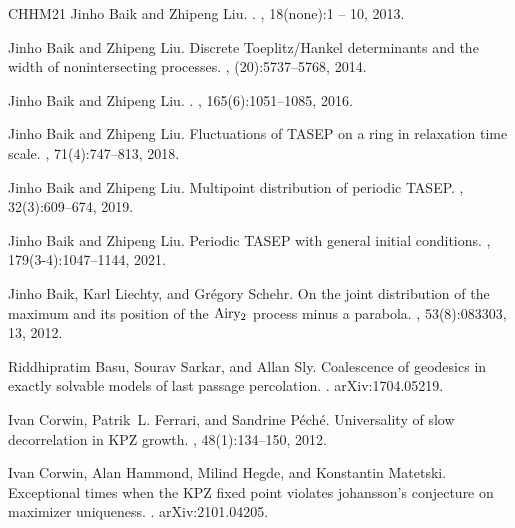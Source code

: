 \documentclass{article}
\numberwithin{equation}{section}
\begin{document}
\begin{thebibliography}{CHHM21}
	Jinho Baik and Zhipeng Liu.
	.
	, 18(none):1 -- 10,
	2013.
	
	Jinho Baik and Zhipeng Liu.
	\newblock Discrete {T}oeplitz/{H}ankel determinants and the width of
	nonintersecting processes.
	, (20):5737--5768, 2014.
	
	Jinho Baik and Zhipeng Liu.
	.
	, 165(6):1051--1085, 2016.
	
	Jinho Baik and Zhipeng Liu.
	\newblock Fluctuations of {TASEP} on a ring in relaxation time scale.
	, 71(4):747--813, 2018.
	
	Jinho Baik and Zhipeng Liu.
	\newblock Multipoint distribution of periodic {TASEP}.
	, 32(3):609--674, 2019.
	
	Jinho Baik and Zhipeng Liu.
	\newblock Periodic {TASEP} with general initial conditions.
	, 179(3-4):1047--1144, 2021.
	
	Jinho Baik, Karl Liechty, and Gr{\'e}gory Schehr.
	\newblock On the joint distribution of the maximum and its position of the
	{$\rm Airy_2$} process minus a parabola.
	, 53(8):083303, 13, 2012.
	
	Riddhipratim Basu, Sourav Sarkar, and Allan Sly.
	\newblock Coalescence of geodesics in exactly solvable models of last passage
	percolation.
	.
	\newblock arXiv:1704.05219.
	
	Ivan Corwin, Patrik~L. Ferrari, and Sandrine P{\'e}ch{\'e}.
	\newblock Universality of slow decorrelation in {KPZ} growth.
	, 48(1):134--150,
	2012.
	
	Ivan Corwin, Alan Hammond, Milind Hegde, and Konstantin Matetski.
	\newblock Exceptional times when the {KPZ} fixed point violates johansson's
	conjecture on maximizer uniqueness.
	.
	\newblock arXiv:2101.04205.
	

\end{thebibliography}
\end{document}
